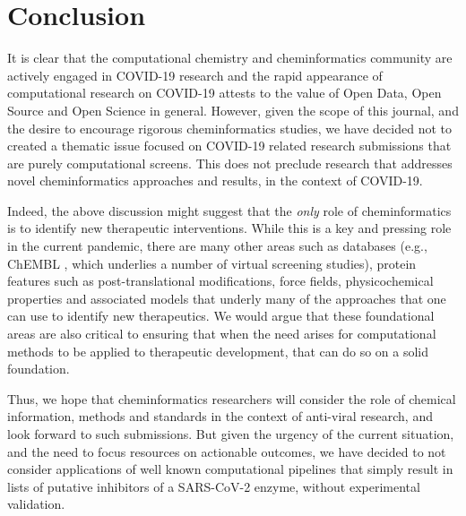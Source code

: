 \documentclass{bmcart}
\begin{document}
\section*{Conclusion}

It is clear that the computational chemistry and cheminformatics
community are actively engaged in COVID-19 research and the rapid
appearance of computational research \cite{jcim_covid_editorial} on
COVID-19 attests to the value of Open Data, Open Source and Open
Science in general. However, given the scope of this journal, and the
desire to encourage rigorous cheminformatics studies, we have decided
not to created a thematic issue focused on COVID-19 related research
submissions that are purely computational screens. This does not
preclude research that addresses novel cheminformatics approaches and
results, in the context of COVID-19.

Indeed, the above discussion might suggest that the \emph{only} role
of cheminformatics is to identify new therapeutic interventions. While
this is a key and pressing role in the current pandemic, there are
many other areas such as databases (e.g., ChEMBL \cite{chembl}, which
underlies a number of virtual screening studies), protein features
such as post-translational modifications, force fields,
physicochemical properties and associated models that underly many of
the approaches that one can use to identify new therapeutics. We would
argue that these foundational areas are also critical to ensuring that
when the need arises for computational methods to be applied to
therapeutic development, that can do so on a solid foundation.

Thus, we hope that cheminformatics researchers will consider the role
of chemical information, methods and standards in the context of
anti-viral research, and look forward to such submissions. But given
the urgency of the current situation, and the need to focus resources
on actionable outcomes, we have decided to not consider applications
of well known computational pipelines that simply result in lists of
putative inhibitors of a SARS-CoV-2 enzyme, without experimental
validation.
\end{document}
